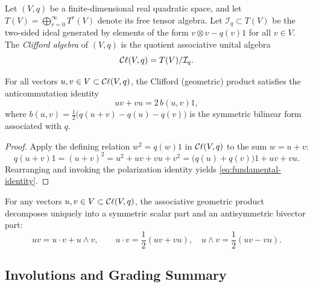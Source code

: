 \documentclass[11pt,a4paper]{article}
\begin{document}
\begin{definition}
  \label{def:clifford-algebra}
  Let $(V, q)$ be a finite-dimensional real quadratic space, and let
  $T(V) = \bigoplus_{r=0}^{\infty} T^r(V)$ denote its free tensor algebra.
  Let $\mathcal{I}_q \subset T(V)$ be the two-sided ideal generated by elements
  of the form $v \otimes v - q(v) 1$ for all $v \in V$. The
  \emph{Clifford algebra} of $(V, q)$ is the quotient associative unital
  algebra
  \begin{equation}
    \label{eq:clifford-quotient}
    \mathcal{C}\ell(V, q) = T(V) / \mathcal{I}_q.
  \end{equation}
\end{definition}

\begin{proposition}
  \label{prop:polarization}
  For all vectors $u, v \in V \subset \mathcal{C}\ell(V, q)$, the Clifford (geometric)
  product satisfies the anticommutation identity
  \begin{equation}
    \label{eq:fundamental-identity}
    uv + vu = 2\, b(u, v) 1,
  \end{equation}
  where $b(u, v) = \tfrac{1}{2}\bigl(q(u + v) - q(u) - q(v)\bigr)$ is the
  symmetric bilinear form associated with $q$.
\end{proposition}

\begin{proof}
  Apply the defining relation $w^2 = q(w) 1$ in $\mathcal{C}\ell(V, q)$ to the sum
  $w = u + v$:
  \[
    q(u + v) 1 = (u + v)^2 = u^2 + uv + vu + v^2 = \bigl(q(u) + q(v)\bigr) 1 + uv + vu.
  \]
  Rearranging and invoking the polarization identity yields
  \cref{eq:fundamental-identity}.
\end{proof}

\begin{keyresult}
  For any vectors $u, v \in V \subset \mathcal{C}\ell(V, q)$, the associative geometric
  product decomposes uniquely into a symmetric scalar part and an
  antisymmetric bivector part:
  \begin{equation}
    \label{eq:geometric-product}
    uv = u \cdot v + u \wedge v, \qquad
    u \cdot v = \frac{1}{2}(uv + vu), \quad
    u \wedge v = \frac{1}{2}(uv - vu).
  \end{equation}
\end{keyresult}

\subsection{Involutions and Grading Summary}
\label{subsec:involutions}
\end{document}
